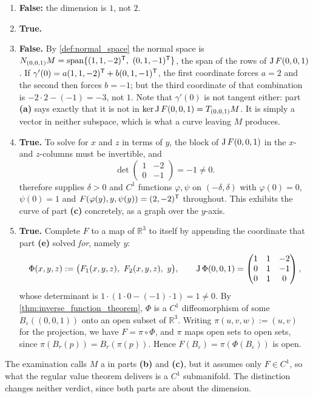 \begin{exercisesolution}
\begin{enumerate}[label=\textbf{(\alph*)}]
    inside $M$, then $F\circ\gamma$ would be constant and the derivative would vanish. So
    $\gamma$ meets $M$ at $t=0$ and immediately leaves it.
  \item \textbf{False:} the dimension is $1$, not $2$.
  \item \textbf{True.}
  \item \textbf{False.} By \cref{def:normal_space} the normal space is
    $N_{(0,0,1)}M = \operatorname{span}\{(1,1,-2)^{\mathsf{T}},\ (0,1,-1)^{\mathsf{T}}\}$, the span of the
    rows of $\operatorname{J} F(0,0,1)$. If $\gamma'(0) = a(1,1,-2)^{\mathsf{T}} + b(0,1,-1)^{\mathsf{T}}$, the first
    coordinate forces $a = 2$ and the second then forces $b = -1$; but the third coordinate of
    that combination is $-2\cdot2 - (-1) = -3$, not $1$. Note that $\gamma'(0)$ is not tangent
    either: part \textbf{(a)} says exactly that it is not in $\ker\operatorname{J} F(0,0,1) = T_{(0,0,1)}M$.
    It is simply a vector in neither subspace, which is what a curve leaving $M$ produces.
  \item \textbf{True.} To solve for $x$ and $z$ in terms of $y$, the block of $\operatorname{J} F(0,0,1)$ in
    the $x$- and $z$-columns must be invertible, and
    \[\det\begin{pmatrix} 1 & -2 \\ 0 & -1\end{pmatrix} = -1 \neq 0 .\]
     therefore supplies $\delta > 0$ and $C^1$ functions
    $\varphi,\psi$ on $(-\delta,\delta)$ with $\varphi(0) = 0$, $\psi(0) = 1$ and
    $F(\varphi(y),y,\psi(y)) = (2,-2)^{\mathsf{T}}$ throughout. This exhibits the curve of part
    \textbf{(c)} concretely, as a graph over the $y$-axis.
  \item \textbf{True.} Complete $F$ to a map of $\mathbb{R}^3$ to itself by appending the
    coordinate that part \textbf{(e)} solved \emph{for}, namely $y$:
    \[\Phi(x,y,z) := \big(F_1(x,y,z),\ F_2(x,y,z),\ y\big), \qquad
      \Jac\Phi(0,0,1) = \begin{pmatrix} 1 & 1 & -2 \\ 0 & 1 & -1 \\ 0 & 1 & 0\end{pmatrix},\]
    whose determinant is $1 \cdot (1\cdot 0 - (-1)\cdot 1) = 1 \neq 0$. By
    \cref{thm:inverse_function_theorem}, $\Phi$ is a $C^1$ diffeomorphism of some
    $B_\varepsilon((0,0,1))$ onto an open subset of $\mathbb{R}^3$. Writing $\pi(u,v,w) := (u,v)$
    for the projection, we have $F = \pi\circ\Phi$, and $\pi$ maps open sets to open sets, since
    $\pi(B_r(p)) = B_r(\pi(p))$. Hence $F(B_\varepsilon) = \pi(\Phi(B_\varepsilon))$ is open.
\end{enumerate}

\begin{ainote}
The examination calls $M$ a  in parts \textbf{(b)} and \textbf{(c)}, but it
assumes only $F \in C^1$, so what the regular value theorem delivers is a $C^1$ submanifold. The
distinction changes neither verdict, since both parts are about the dimension.
\end{ainote}
\end{exercisesolution}

